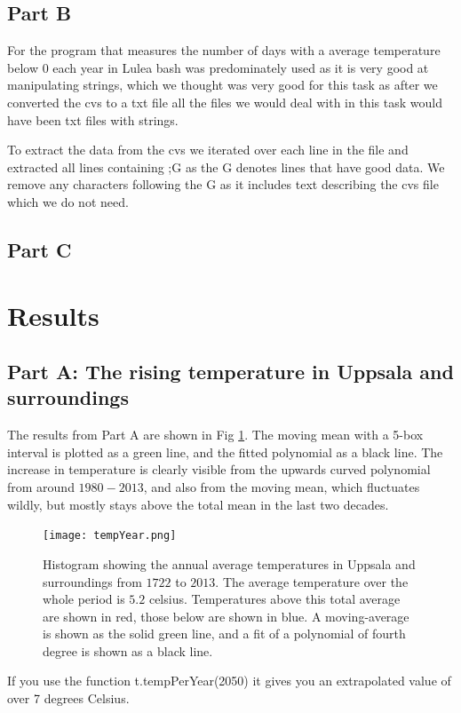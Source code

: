 \documentclass[a4paper]{article}
\begin{document}
\subsection{Part B}
For the program that measures the number of days with a average temperature below 0 each year in Lulea bash was predominately used as it is very good at manipulating strings,  which we thought was very good for this task as after we converted the cvs to a txt file all the files we would deal with in this task would have been txt files with strings.

To extract the data from the cvs we iterated over each line in the file and extracted all lines containing ;G as the G denotes lines that have good data. We remove any characters following the G as it includes text describing the cvs file which we do not need.

\subsection{Part C}




\section{Results}
\subsection{Part A: The rising temperature in Uppsala and surroundings}
The results from Part A are shown in Fig \ref{fig:year}. The moving mean with a 5-box interval is plotted as a green line, and the fitted polynomial as a black line. The increase in temperature is clearly visible from the upwards curved polynomial from around $1980-2013$, and also from the moving mean, which fluctuates wildly, but mostly stays above the total mean in the last two decades.
\begin{figure}[H]
   \centering
  \texttt{[image: tempYear.png]}
    \caption{Histogram showing the annual average temperatures in Uppsala and surroundings from $1722$ to $2013$. The average temperature over the whole period is $5.2$ celsius. Temperatures above this total average are shown in red, those below are shown in blue. A moving-average is shown as the solid green line, and a fit of a polynomial of fourth degree is shown as a black line.}
   \label{fig:year}
\end{figure}
If you use the function t.tempPerYear(2050) it gives you an extrapolated value of over 7 degrees Celsius.
\end{document}
